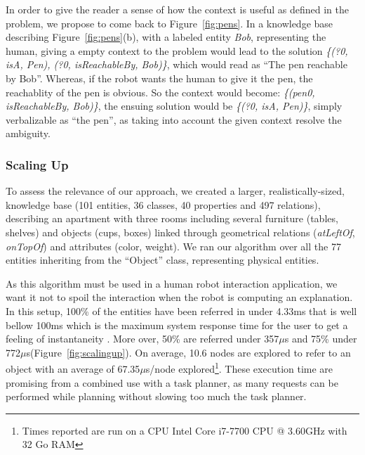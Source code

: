 \documentclass[a4paper,11pt,twoside]{StyleThese}
\begin{document}
In order to give the reader a sense of how the context is useful as defined in the problem, we propose to come back to Figure~\ref{fig:pens}.
In a knowledge base describing Figure~\ref{fig:pens}(b), with a labeled entity \textit{Bob}, representing the human, giving a empty context to the problem would lead to the solution \textit{\{(?0, isA, Pen), (?0, isReachableBy, Bob)\}}, which would read as ``The pen reachable by Bob''. Whereas, if the robot wants the human to give it the pen, the reachablity of the pen is obvious. So the context would become: \textit{\{(pen0, isReachableBy, Bob)\}}, the ensuing solution would be \textit{\{(?0, isA, Pen)\}}, simply verbalizable as ``the pen'', as taking into account the given context resolve the ambiguity.

\subsubsection{Scaling Up}

To assess the relevance of our approach, we created a larger, realistically-sized, knowledge base (101 entities, 36 classes, 40 properties and 497 relations), describing an apartment with three rooms including several furniture (tables, shelves) and objects (cups, boxes) linked through geometrical relations (\textit{atLeftOf}, \textit{onTopOf}) and attributes (color, weight).
We ran our algorithm over all the 77 entities inheriting from the ``Object'' class, representing physical entities. 

\newcommand{\us}{$\mu$s\xspace}

As this algorithm must be used in a human robot interaction application, we want it not to spoil the interaction when the robot is computing an explanation. In this setup, 100\% of the entities have been referred in under 4.33ms that is well bellow 100ms which is the maximum system response time for the user to get a feeling of instantaneity \cite{miller1968response}. More over, 50\% are referred under 357\us and 75\% under 772\us (Figure~\ref{fig:scalingup}). On average, 10.6 nodes are explored to refer to an object with an average of 67.35\us/node explored\footnote{Times reported are run on a CPU Intel Core i7-7700 CPU @ 3.60GHz with 32 Go RAM}. These execution time are promising from a combined use with a task planner, as many requests can be performed while planning without slowing too much the task planner.
\end{document}
